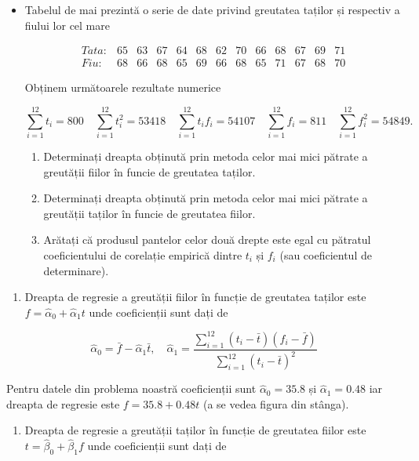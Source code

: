 \documentclass[]{article}
\providecommand{\tightlist}{%
  \setlength{\itemsep}{0pt}\setlength{\parskip}{0pt}}
\newenvironment{frshaded*}{%
  \def\FrameCommand{\fboxrule=\FrameRule\fboxsep=\FrameSep \fcolorbox{framecolor}{shadecolor1}}%
  \MakeFramed {\advance\hsize-\width \FrameRestore}}%
{\endMakeFramed}
\newenvironment{rmdblock}[1]
  {\begin{frshaded*}
  \begin{itemize}
  \renewcommand{\labelitemi}{
    \raisebox{-.7\height}[0pt][0pt]{
      {\setkeys{Gin}{width=2em,keepaspectratio}\texttt{[image: images/icons/\#1]}}
    }
  }
  \item
  }
  {
  \end{itemize}
  \end{frshaded*}
  }
\newenvironment{rmdexercise}
  {\begin{rmdblock}{exercise}}
  {\end{rmdblock}}
\begin{document}
\begin{rmdexercise}
Tabelul de mai prezintă o serie de date privind greutatea taților și
respectiv a fiului lor cel mare

\[
\begin{array}{lcccccccccccc}
  Tata: & 65 & 63 & 67 & 64 & 68 & 62 & 70 & 66 & 68 & 67 & 69 & 71\\
  Fiu: & 68 & 66 & 68 & 65 & 69 & 66 & 68 & 65 & 71 & 67 & 68 & 70
\end{array}
\]

Obținem următoarele rezultate numerice

\[
  \sum_{i = 1}^{12}t_i = 800 \quad \sum_{i = 1}^{12}t_i^2 = 53418 \quad \sum_{i = 1}^{12}t_i f_i = 54107 \quad \sum_{i = 1}^{12}f_i = 811 \quad \sum_{i = 1}^{12}f_i^2 = 54849.
\]

\begin{enumerate}
\def\labelenumi{\arabic{enumi}.}
\item
  Determinați dreapta obținută prin metoda celor mai mici pătrate a
  greutății fiilor în funcie de greutatea taților.
\item
  Determinați dreapta obținută prin metoda celor mai mici pătrate a
  greutății taților în funcie de greutatea fiilor.
\item
  Arătați că produsul pantelor celor două drepte este egal cu pătratul
  coeficientului de corelație empirică dintre \(t_i\) și \(f_i\) (sau
  coeficientul de determinare).
\end{enumerate}
\end{rmdexercise}

\begin{enumerate}
\def\labelenumi{\arabic{enumi}.}
\tightlist
\item
  Dreapta de regresie a greutății fiilor în funcție de greutatea taților
  este \(f = \hat\alpha_0 + \hat\alpha_1 t\) unde coeficienții sunt dați
  de
\end{enumerate}

\[
  \hat\alpha_0 = \bar f - \hat\alpha_1 \bar t, \quad \hat\alpha_1 = \frac{\sum_{i = 1}^{12}(t_i - \bar t)(f_i - \bar f)}{\sum_{i = 1}^{12}(t_i - \bar t)^2}
\]

Pentru datele din problema noastră coeficienții sunt
\(\hat\alpha_0 = 35.8\) și \(\hat\alpha_1 = 0.48\) iar dreapta de
regresie este \(f = 35.8 + 0.48 t\) (a se vedea figura din stânga).

\begin{enumerate}
\def\labelenumi{\arabic{enumi}.}
\setcounter{enumi}{1}
\tightlist
\item
  Dreapta de regresie a greutății taților în funcție de greutatea fiilor
  este \(t = \hat\beta_0 + \hat\beta_1 f\) unde coeficienții sunt dați
  de
\end{enumerate}
\end{document}
